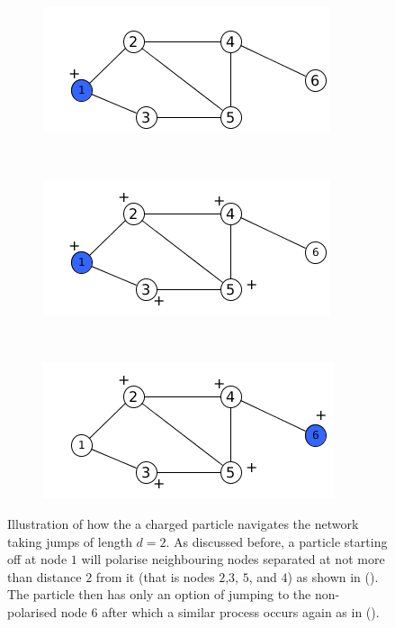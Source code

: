 \documentclass[10pt,a4paper]{article}
\theoremstyle{plain}
\theoremstyle{definition}
\begin{document}
    	    \begin{figure}[H]
    	    	\centering
    	    	\begin{subfigure}[b]{0.3\textwidth}
    	    		\includegraphics[width=\textwidth]{images/nodecharge1.png}
    	    		\caption{}
    	    		\label{polarityl21}
    	    	\end{subfigure}~
    	    	\begin{subfigure}[b]{0.3\textwidth}
    	    		\includegraphics[width=\textwidth]{images/nodecharge41.png}
    	    		\caption{}
    	    		\label{polarityl22}
    	    	\end{subfigure}~ 
    	    	\begin{subfigure}[b]{0.3\textwidth}
    	    		\includegraphics[width=\textwidth]{images/nodecharge4.png}
    	    		\caption{}
    	    		\label{polarityl23}
    	    	\end{subfigure}
    	    	\caption{Illustration of how the a charged particle navigates the network taking jumps of length $d=2$. As discussed before, a particle starting off at node $1$ will polarise neighbouring nodes separated at not more than distance $2$ from it (that is nodes $2$,$3$, $5$, and $4$) as shown in (). The particle then has only an option of jumping to the non-polarised node $6$ after which a similar process occurs again as in (). } \label{2-path-particle}
    	    \end{figure}
    	    
\end{document}
